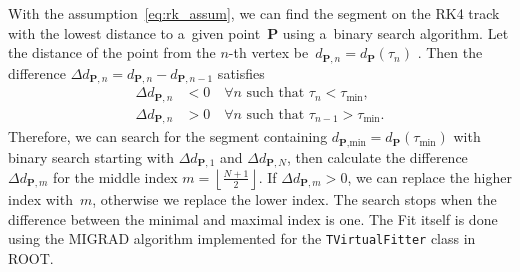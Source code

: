 		With the assumption~\ref{eq:rk_assum}, we can find the segment on the \ac{RK4} track with the lowest distance to a~given point~$\mathbf{P}$ using a~binary search algorithm. Let the distance of the point from the $n$\nobreakdash-th vertex %
		be~$d_{\mathbf{P},n} = d_{\mathbf{P}}(\tau_n)$%
		. Then the difference $\Delta d_{\mathbf{P},n} = d_{\mathbf{P},n}-d_{\mathbf{P},n-1}$ satisfies
			\begin{equation}
				\begin{aligned}
					\Delta d_{\mathbf{P},n} &< 0\quad \forall n \text{ such that } \tau_n < \tau_\text{min},\\
					\Delta d_{\mathbf{P},n} &> 0\quad \forall n \text{ such that } \tau_{n-1} > \tau_\text{min}.
				\end{aligned}
			\end{equation}
		Therefore, we can search for the segment containing $d_{\textbf{P},\text{min}} = d_{\mathbf{P}}(\tau_\text{min})$ with binary search starting with $\Delta d_{\mathbf{P},1}$ and $\Delta d_{\mathbf{P},N}$, then calculate the difference $\Delta d_{\mathbf{P},m}$ for the middle index $m = \left\lfloor\frac{N+1}{2}\right\rfloor$. If $\Delta d_{\mathbf{P},m} > 0$, we can replace the higher index with~$m$, otherwise we replace the lower index. The search stops when the difference between the minimal and maximal index is one. The Fit itself is done using the MIGRAD algorithm implemented for the \texttt{TVirtualFitter} class in ROOT.
		

